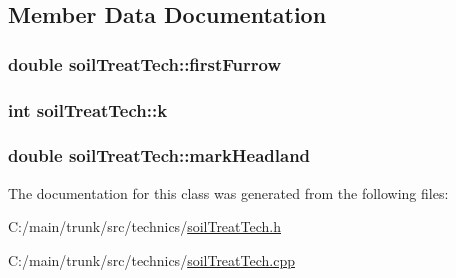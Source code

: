 \subsection{Member Data Documentation}
\hypertarget{classsoil_treat_tech_a8a452833fde1e89e811dab21c30265e6}{
\subsubsection[{firstFurrow}]{\setlength{\rightskip}{0pt plus 5cm}double {\bf soilTreatTech::firstFurrow}}}
\label{classsoil_treat_tech_a8a452833fde1e89e811dab21c30265e6}
\hypertarget{classsoil_treat_tech_a82f97281d5fbea96370f73eba5b37260}{
\subsubsection[{k}]{\setlength{\rightskip}{0pt plus 5cm}int {\bf soilTreatTech::k}}}
\label{classsoil_treat_tech_a82f97281d5fbea96370f73eba5b37260}
\hypertarget{classsoil_treat_tech_aed4d8643a628c0552169d6e0b7773cbc}{
\subsubsection[{markHeadland}]{\setlength{\rightskip}{0pt plus 5cm}double {\bf soilTreatTech::markHeadland}}}
\label{classsoil_treat_tech_aed4d8643a628c0552169d6e0b7773cbc}


The documentation for this class was generated from the following files:\begin{DoxyCompactItemize}
\item 
C:/main/trunk/src/technics/\hyperlink{soil_treat_tech_8h}{soilTreatTech.h}\item 
C:/main/trunk/src/technics/\hyperlink{soil_treat_tech_8cpp}{soilTreatTech.cpp}\end{DoxyCompactItemize}
